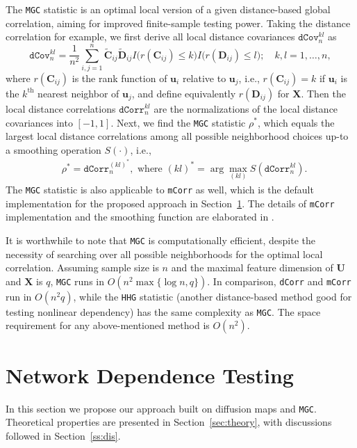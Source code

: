 \documentclass[11pt]{article}
\theoremstyle{definition}
\begin{document}
The \texttt{MGC} statistic is an optimal local version of a given distance-based global correlation, aiming for improved finite-sample testing power. Taking the distance correlation for example, we first derive all local distance covariances $\texttt{dCov}^{kl}_{n}$ as 
\begin{equation}
\label{eq:MGC}
\texttt{dCov}^{kl}_{n} = \frac{1}{n^2} \sum\limits_{i,j=1}^{n} \tilde{\mathbf{C}}_{ij} \tilde{\mathbf{D}}_{ij} I\big( r(\mathbf{C}_{ij}) \leq k \big) I\big(  r(\mathbf{D}_{ij}) \leq l  \big); \quad k,l= 1, \ldots, n,
\end{equation}
where $r(\mathbf{C}_{ij})$ is the rank function of $\mathbf{u}_{i}$ relative to $\mathbf{u}_{j}$, i.e., $r(\mathbf{C}_{ij})=k$ if $\mathbf{u}_{i}$ is the $k^{\mbox{th}}$ nearest neighbor of $\mathbf{u}_{j}$, and define equivalently $r(\mathbf{D}_{ij})$ for $\mathbf{X}$. Then the local distance correlations $\texttt{dCorr}_{n}^{kl}$ are the normalizations of the local distance covariances into $[-1,1]$. Next, we find the \texttt{MGC} statistic $\rho^{*}$, which equals the largest local distance correlations among all possible neighborhood choices up-to a smoothing operation $S(\cdot)$, i.e.,
\begin{align}
\label{eq:MGC2}
& \rho^{*}=\texttt{dCorr}_{n}^{(kl)^{*}}, \mbox{ where } (kl)^{*}=\arg\max_{(kl)}S(\texttt{dCorr}_{n}^{kl}).
\end{align}
The \texttt{MGC} statistic is also applicable to \texttt{mCorr} as well, which is the default implementation for the proposed approach in Section~\ref{sec:method}. The details of \texttt{mCorr} implementation and the smoothing function are elaborated in \cite{shen2016discovering}.  

It is worthwhile to note that \texttt{MGC} is computationally efficient, despite the necessity of searching over all possible neighborhoods for the optimal local correlation. Assuming sample size is $n$ and the maximal feature dimension of $\mathbf{U}$ and $\mathbf{X}$ is $q$, \texttt{MGC} runs in $O(n^2 \max\{\log n,q\})$. In comparison, \texttt{dCorr} and \texttt{mCorr} run in $O(n^2 q)$, while the \texttt{HHG} statistic (another distance-based method good for testing nonlinear dependency) has the same complexity as \texttt{MGC}. The space requirement for any above-mentioned method is $O(n^2)$.

\section{Network Dependence Testing}
\label{sec:method}
In this section we propose our approach built on diffusion maps and \texttt{MGC}. Theoretical properties are presented in Section~\ref{sec:theory}, with discussions followed in Section~\ref{ss:dis}.
\end{document}
